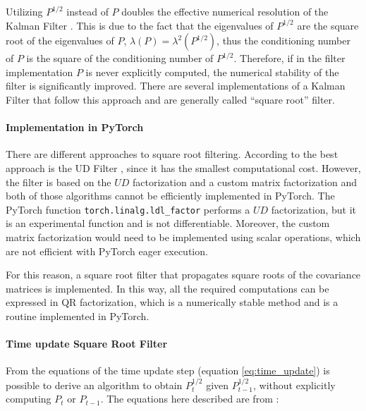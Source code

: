 \documentclass{article}
\begin{document}
Utilizing $P^{1/2}$ instead of $P$ doubles the effective numerical resolution of the Kalman Filter \cite{kaminski_discrete_1971,dan_simon_optimal_2006,rutten_square-root_2013}. This is due to the fact that the eigenvalues of $P^{1/2}$ are the square root of the eigenvalues of $P$, $\lambda(P) = \lambda^2(P^{1/2})$, thus the conditioning number of $P$ is the square of the conditioning number of $P^{1/2}$. Therefore, if in the filter implementation $P$ is never explicitly computed, the numerical stability of the filter is significantly improved.
There are several implementations of a Kalman Filter that follow this approach \cite{potter_statistical_1963,carlson_fast_1973,bierman_numerical_1977} and are generally called ``square root'' filter.


\paragraph{Implementation in PyTorch}
There are different approaches to square root filtering. According to \textcite{mohinder_s_grewal_kalman_2001} the best approach is the UD Filter \cite{bierman_numerical_1977}, since it has the smallest computational cost. However, the filter is based on the $UD$ factorization and a custom matrix factorization \cite{mohinder_s_grewal_kalman_2001} and both of those algorithms cannot be efficiently implemented in \textsf{PyTorch}. The \textsf{PyTorch} function \verb|torch.linalg.ldl_factor| performs a $UD$ factorization, but it is an experimental function and is not differentiable. Moreover, the custom matrix factorization would need to be implemented using scalar operations, which are not efficient with \textsf{PyTorch} eager execution.

For this reason, a square root filter that propagates square roots of the covariance matrices is implemented. In this way, all the required computations can be expressed in QR factorization, which is a numerically stable method and is a routine implemented in \textsf{PyTorch}.

\paragraph{Time update Square Root Filter}

From the equations of the time update step (equation \ref{eq:time_update}) is possible to derive an algorithm to obtain $P_t^{1/2}$ given $P_{t-1}^{1/2}$, without explicitly computing $P_t$ or $P_{t-1}$. The equations here described are from \textcite[eq. 6.60]{mohinder_s_grewal_kalman_2001}:
\end{document}
